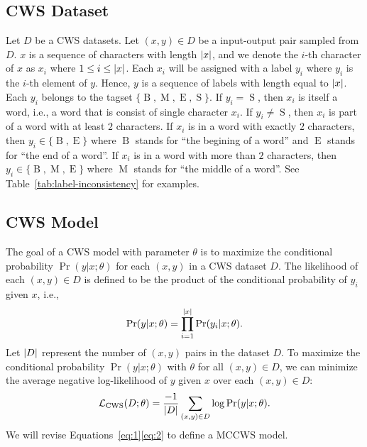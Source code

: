 \documentclass[11pt]{article}
\newcommand{\set}[1]{\lbrace #1 \rbrace}
\newcommand{\loss}{\mathcal{L}}
\newcommand{\BTag}{\operatorname{B}}
\newcommand{\MTag}{\operatorname{M}}
\newcommand{\ETag}{\operatorname{E}}
\newcommand{\STag}{\operatorname{S}}
\newcommand{\TagSet}{\set{\BTag, \MTag, \ETag, \STag}}
\newcommand{\opCWS}{\operatorname{CWS}}
\DeclarePairedDelimiter{\abs}{\lvert}{\rvert}
\begin{document}
\subsection{CWS Dataset}\label{sec:data}

Let \(D\) be a CWS datasets.
Let \((x, y) \in D\) be a input-output pair sampled from \(D\).
\(x\) is a sequence of characters with length \(\abs{x}\), and we denote the \(i\)-th character of \(x\) as \(x_i\) where \(1 \leq i \leq \abs{x}\).
Each \(x_i\) will be assigned with a label \(y_i\) where \(y_i\) is the \(i\)-th element of \(y\).
Hence, \(y\) is a sequence of labels with length equal to \(\abs{x}\).
Each \(y_i\) belongs to the tagset \(\TagSet\).
If \(y_i = \STag\), then \(x_i\) is itself a word, i.e., a word that is consist of single character \(x_i\).
If \(y_i \neq \STag\), then \(x_i\) is part of a word with at least \(2\) characters.
If \(x_i\) is in a word with exactly \(2\) characters, then \(y_i \in \set{\BTag, \ETag}\) where \(\BTag\) stands for ``the begining of a word'' and \(\ETag\) stands for ``the end of a word''.
If \(x_i\) is in a word with more than \(2\) characters, then \(y_i \in \set{\BTag, \MTag, \ETag}\) where \(\MTag\) stands for ``the middle of a word''.
See Table~\ref{tab:label-inconsistency} for examples.

\subsection{CWS Model}\label{sec:cws}

The goal of a CWS model with parameter \(\theta\) is to maximize the conditional probability \(\Pr(y | x ; \theta)\) for each \((x, y)\) in a CWS dataset \(D\).
The likelihood of each \((x, y) \in D\) is defined to be the product of the conditional probability of \(y_i\) given \(x\), i.e.,
\begin{equation}\label{eq:1}
  \Pr(y | x ; \theta) = \prod_{i = 1}^{\abs{x}} \Pr(y_i | x ; \theta).
\end{equation}
Let \(\abs{D}\) represent the number of \((x, y)\) pairs in the dataset \(D\).
To maximize the conditional probability \(\Pr(y | x ; \theta)\) with \(\theta\) for all \((x, y) \in D\), we can minimize the average negative log-likelihood of \(y\) given \(x\) over each \((x, y) \in D\):
\begin{equation}\label{eq:2}
  \loss_{\opCWS}(D ; \theta) = \dfrac{-1}{\abs{D}} \sum_{(x, y) \in D} \log \Pr(y|x ; \theta).
\end{equation}
We will revise Equations~\eqref{eq:1}\eqref{eq:2} to define a MCCWS model.
\end{document}
